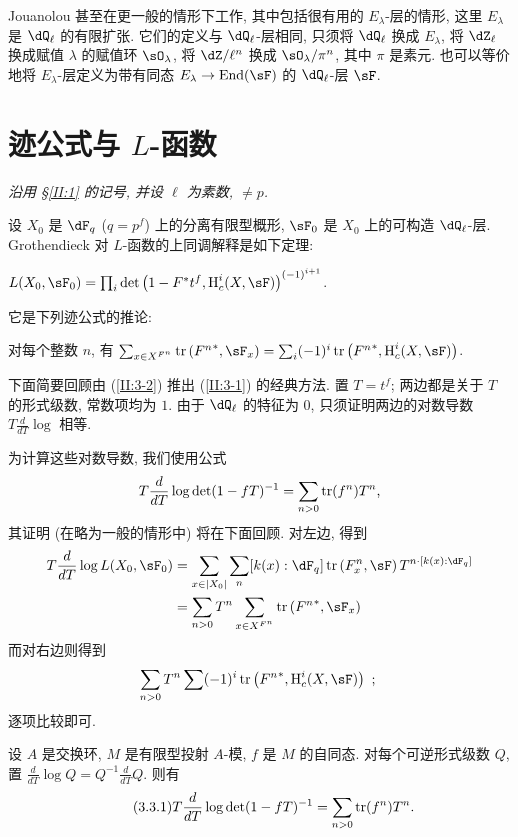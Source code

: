 Jouanolou 甚至在更一般的情形下工作, 其中包括很有用的 $E_\lambda$-层的情形, 这里 $E_\lambda$ 是 $\dQ_\ell$ 的有限扩张. 它们的定义与 $\dQ_\ell$-层相同, 只须将 $\dQ_\ell$ 换成 $E_\lambda$, 将 $\dZ_\ell$ 换成赋值 $\lambda$ 的赋值环 $\sO_\lambda$, 将 $\dZ/\ell^n$ 换成 $\sO_\lambda/\pi^n$, 其中 $\pi$ 是素元. 也可以等价地将 $E_\lambda$-层定义为带有同态 $E_\lambda\to\operatorname{End}(\sF)$ 的 $\dQ_\ell$-层 $\sF$.

\section{迹公式与 \texorpdfstring{$L$}{L}-函数}\label{II:3}

\emph{沿用 \S\ref{II:1} 的记号, 并设 $\ell$ 为素数, $\ne p$.}

设 $X_0$ 是 $\dF_q$ ($q=p^f$) 上的分离有限型概形, $\sF_0$ 是 $X_0$ 上的可构造 $\dQ_\ell$-层. Grothendieck 对 $L$-函数的上同调解释是如下定理:

\begin{theorem_}\label{II:3-1}
$L(X_0,\sF_0) = \prod_i \det\left(1-F^* t^f, \h_c^i(X,\sF)\right)^{(-1)^{i+1}}$.
\end{theorem_}

它是下列迹公式的推论:

\begin{theorem_}\label{II:3-2}
对每个整数 $n$, 有
$\sum_{x\in X^{F^n}} \tr\left({F^n}^*,\sF_x\right) = \sum_i (-1)^i \tr\left({F^n}^*,\h_c^i(X,\sF)\right)$.
\end{theorem_}

下面简要回顾由 (\ref{II:3-2}) 推出 (\ref{II:3-1}) 的经典方法. 置 $T=t^f$; 两边都是关于 $T$ 的形式级数, 常数项均为 $1$. 由于 $\dQ_\ell$ 的特征为 $0$, 只须证明两边的对数导数 $T\frac{d}{dT}\log$ 相等.

为计算这些对数导数, 我们使用公式
\[
  T \frac{d}{dT}\log\det(1-f T)^{-1} = \sum_{n>0} \operatorname{tr}(f^n) T^n \text{,}
\]
其证明 (在略为一般的情形中) 将在下面回顾. 对左边, 得到
\begin{align*}
  T\frac{d}{dT}\log L(X_0,\sF_0)
    &= \sum_{x\in |X_0|} \sum_n [k(x):\dF_q] \tr\left(F_x^n,\sF\right) T^{n\cdot[k(x):\dF_q]} \\
    &= \sum_{n>0} T^n \sum_{x\in X^{F^n}} \tr\left({F^n}^*,\sF_x\right)
\end{align*}
而对右边则得到
\[
  \sum_{n>0} T^n \sum (-1)^i \tr\left({F^n}^*,\h_c^i(X,\sF)\right) \text{ ; }
\]
逐项比较即可.

\begin{proposition_}\label{II:3-3}
设 $A$ 是交换环, $M$ 是有限型投射 $A$-模, $f$ 是 $M$ 的自同态. 对每个可逆形式级数 $Q$, 置 $\frac{d}{dT}\log Q = Q^{-1}\frac{d}{dT}Q$. 则有
\begin{equation*}\tag{3.3.1}\label{II:eq:3-3-1}
  T\frac{d}{dT}\log\det(1-f T)^{-1} = \sum_{n>0} \operatorname{tr}(f^n) T^n \text{.}
\end{equation*}
\end{proposition_}

